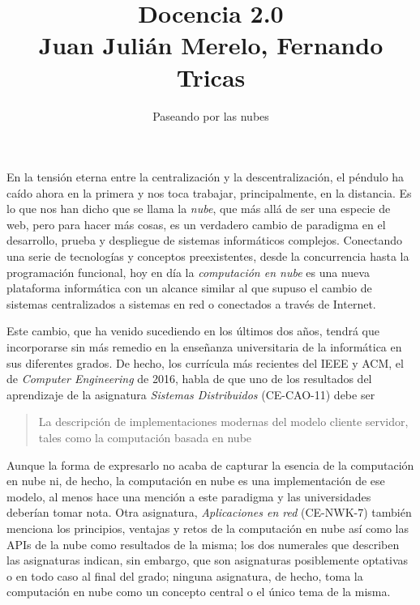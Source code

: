 \documentclass[twoside,10pt]{article}
\title{Docencia 2.0\\ \large Juan Juli\'an Merelo, Fernando 
Tricas}
\author{\LARGE Paseando por las nubes}
\date{}
\newcounter{num}
\begin{document}
\addtocounter{page}{2}

\maketitle
\vspace*{-8ex}

\begin{multicols}{2}

  En la tensi\'on eterna entre la centralizaci\'on y la descentralizaci\'on,
  el p\'endulo ha ca\'ido ahora en la primera 
  y nos toca trabajar,
  principalmente, en la distancia. Es lo que nos han dicho que se
  llama la {\em nube}, que m\'as all\'a de ser una especie de web, pero para hacer
  m\'as cosas, es un verdadero cambio de paradigma en el desarrollo,
  prueba y despliegue de sistemas inform\'aticos complejos. Conectando
  una serie de tecnolog\'ias y conceptos preexistentes, desde la
  concurrencia hasta la programaci\'on funcional, hoy en d\'ia la {\em
    computaci\'on en nube} es una nueva plataforma inform\'atica con un
  alcance similar al que supuso el cambio de sistemas centralizados a
  sistemas en red o conectados a trav\'es de Internet.

Este cambio, que ha venido sucediendo en los \'ultimos dos a\~nos, tendr\'a
que incorporarse sin m\'as remedio en la ense\~nanza universitaria de la
inform\'atica en sus diferentes grados. De hecho, los curr\'icula m\'as
recientes del IEEE y ACM, el de {\em Computer Engineering} de 2016, habla de
que uno de los resultados del aprendizaje de la asignatura {\em Sistemas
Distribuidos} (CE-CAO-11)
 debe ser 

\begin{quote}
  La descripci\'on de implementaciones modernas del modelo cliente
  servidor, tales como la computaci\'on basada en nube
\end{quote}
Aunque la forma de expresarlo no acaba de capturar la esencia de la
computaci\'on en nube ni, de hecho, la computaci\'on en nube es una
implementaci\'on de ese modelo, al menos hace una menci\'on a este
paradigma y las universidades deber\'ian tomar nota. Otra asignatura,
{\em Aplicaciones en red} (CE-NWK-7) tambi\'en menciona los principios,
ventajas y retos de la computaci\'on en nube as\'i como las APIs de la
nube como resultados de la misma; los dos numerales que describen las
asignaturas indican, sin embargo, que son asignaturas posiblemente
optativas o en todo caso al final del grado; ninguna asignatura, de
hecho, toma la computaci\'on en nube como un concepto central o el \'unico
tema de la misma. 


\end{multicols}
\end{document}

